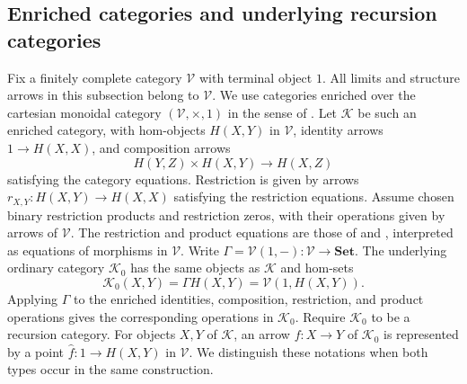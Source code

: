 \documentclass[11pt]{article}
\theoremstyle{definition}
\theoremstyle{remark}
\begin{document}
\subsection{Enriched categories and underlying recursion categories}
\label{sec:definability-algebras}

Fix a finitely complete category $\mathscr V$ with terminal object $1$.
All limits and structure arrows in this subsection belong to $\mathscr V$.
We use categories enriched over the cartesian monoidal category
$(\mathscr V,\times,1)$ in the sense of
\cite[Sections~1.2--1.3]{Kelly}.
Let $\mathcal K$ be such an enriched category, with hom-objects
$H(X,Y)$ in $\mathscr V$, identity
arrows $1\to H(X,X)$, and composition arrows
\[
 H(Y,Z)\times H(X,Y)\longrightarrow H(X,Z)
\]
satisfying the category equations. Restriction is given by arrows
$r_{X,Y}:H(X,Y)\to H(X,X)$ satisfying the restriction equations.
Assume chosen binary restriction products and restriction zeros, with their operations given by arrows of $\mathscr V$.
The restriction and product equations are those of
\cite[Section~2.1]{RestrictionI} and
\cite[Section~4.1]{RestrictionIII}, interpreted as equations
of morphisms in $\mathscr V$.
Write $\Gamma=\mathscr V(1,-):\mathscr V\to\mathbf{Set}$.
The underlying ordinary category $\mathcal K_0$ has the same
objects as $\mathcal K$ and hom-sets
\[
 \mathcal K_0(X,Y)=\Gamma H(X,Y)=\mathscr V(1,H(X,Y)).
\]
Applying $\Gamma$ to the enriched identities, composition,
restriction, and product operations gives the corresponding
operations in $\mathcal K_0$. Require $\mathcal K_0$ to be a
recursion category. For objects $X,Y$ of $\mathcal K$, an arrow
$f:X\to Y$ of $\mathcal K_0$ is represented by a point
$\widehat f:1\to H(X,Y)$ in $\mathscr V$. We distinguish these
notations when both types occur in the same construction.
\end{document}
